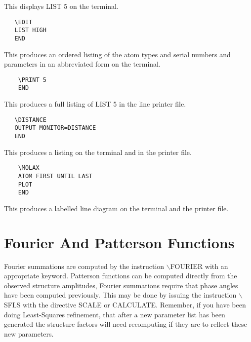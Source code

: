 \documentclass[10pt,a4paper]{report}
\begin{document}
This displays LIST 5 on the terminal.

\small\begin{verbatim}
   \EDIT
   LIST HIGH
   END
\end{verbatim}\normalsize




This produces an ordered listing of the atom types and serial numbers
 and parameters in an abbreviated form on the terminal.

\small\begin{verbatim}
    \PRINT 5
    END
\end{verbatim}\normalsize




This produces a full listing of LIST 5 in the line printer file.



\bigskip{}


\small\begin{verbatim}
   \DISTANCE
   OUTPUT MONITOR=DISTANCE
   END
\end{verbatim}\normalsize




This produces a  listing on the terminal and in the printer file.

\small\begin{verbatim}
    \MOLAX
    ATOM FIRST UNTIL LAST
    PLOT
    END
\end{verbatim}\normalsize




This produces a labelled line diagram on the terminal and the printer file.



\chapter{Fourier And Patterson Functions}


Fourier summations are computed by the instruction $\backslash$FOURIER with an appropriate keyword. Patterson functions can be computed directly from the observed structure amplitudes, Fourier summations require that phase angles have been computed previously. This may be done by issuing the instruction $\backslash$SFLS with the directive SCALE or CALCULATE. Remember, if you have been doing Least-Squares refinement, that after a new parameter list has been generated the structure factors will need recomputing if they are to reflect these new parameters.
\end{document}
